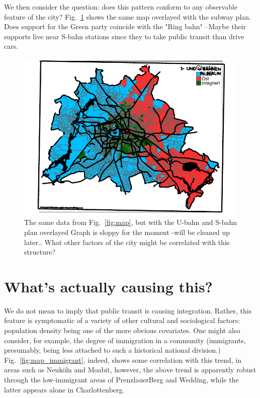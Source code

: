 \documentclass[amsmath,amssymb,nofootinbib,12pt,preprint]{revtex4}
\begin{document}
We then consider the question: does this pattern conform to any observable feature of the city? Fig.~\ref{fig:bahntrace} shows the same map overlayed with the subway plan. Does support for the Green party coincide with the "Ring bahn" --Maybe their supports live near S-bahn stations since they to take public transit than drive cars.


\begin{figure}[h]%
\includegraphics[scale=.85]{../figures/map_W_TRANSITTRACE}%
\caption{ The same data from Fig.~\ref{fig:map}, but with the U-bahn and S-bahn plan overlayed {\color{red} Graph is sloppy for the moment \--will be cleaned up later.}. What other factors of the city might be correlated with this structure?}
\label{fig:bahntrace}%
\end{figure}

\clearpage

\section{What's actually causing this?}

We do not mean to imply that public transit is causing integration. Rather, this feature is symptomatic of a variety of other cultural and sociological factors: population density being one of the more obvious covariates. One might also consider, for example, the degree of immigration in a community (immigrants, presumably, being less attached to such a historical national division.) Fig.~\ref{fig:map_immigrant}, indeed, shows some correlation with this trend, in areas such as Neuk\"oln and Moabit, however, the above trend is apparently robust through the low-immigrant areas of PrenzlauerBerg and Wedding, while the latter appears alone in Charlottenberg.
\end{document}
